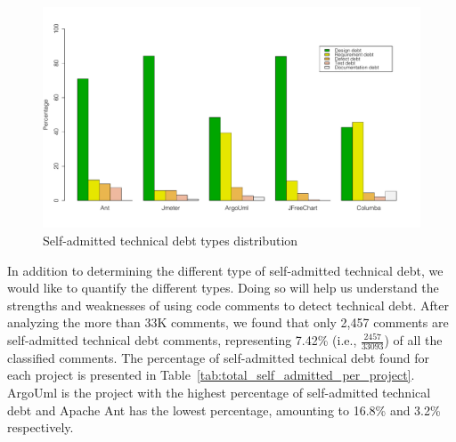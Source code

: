 
\begin{figure}[thb!]
  \centering
  \includegraphics[width=1\textwidth]{figures/chapter3/technical_debt_distribution.pdf}
  \caption{Self-admitted technical debt types distribution}
  \label{chap3:fig:satd_distribution}
\end{figure}

In addition to determining the different type of self-admitted technical debt, we would like to quantify the different types. Doing so will help us understand the strengths and weaknesses of using code comments to detect technical debt. After analyzing the more than 33K comments, we found that only 2,457 comments are self-admitted technical debt comments, representing 7.42\% (i.e., $\frac{2457}{33093}$) of all the classified comments. The percentage of self-admitted technical debt found for each project is presented in Table~\ref{tab:total_self_admitted_per_project}. ArgoUml is the project with the highest percentage of self-admitted technical debt and Apache Ant has the lowest percentage, amounting to 16.8\% and 3.2\% respectively.

